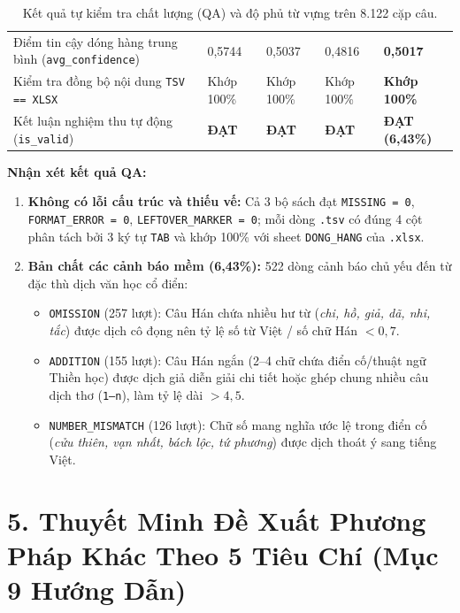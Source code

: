 \documentclass[11pt,a4paper]{article}
\begin{document}
\begin{table}[h!]
\begin{tabular}{L{5.6cm} C{2.1cm} C{2.1cm} C{2.1cm} C{2.5cm}}
Điểm tin cậy dóng hàng trung bình (\texttt{avg\_confidence}) & 0,5744 & 0,5037 & 0,4816 & \textbf{0,5017} \\
Kiểm tra đồng bộ nội dung \texttt{TSV == XLSX} & Khớp 100\% & Khớp 100\% & Khớp 100\% & \textbf{Khớp 100\%} \\
Kết luận nghiệm thu tự động (\texttt{is\_valid}) & \textbf{ĐẠT} & \textbf{ĐẠT} & \textbf{ĐẠT} & \textbf{ĐẠT (6,43\%)} \\
\bottomrule
\end{tabular}
\caption{Kết quả tự kiểm tra chất lượng (QA) và độ phủ từ vựng trên 8.122 cặp câu.}
\end{table}

\noindent\textbf{Nhận xét kết quả QA:}
\begin{enumerate}
    \item \textbf{Không có lỗi cấu trúc và thiếu vế:} Cả 3 bộ sách đạt \texttt{MISSING = 0}, \texttt{FORMAT\_ERROR = 0}, \texttt{LEFTOVER\_MARKER = 0}; mỗi dòng \texttt{.tsv} có đúng 4 cột phân tách bởi 3 ký tự \texttt{TAB} và khớp 100\% với sheet \texttt{DONG\_HANG} của \texttt{.xlsx}.
    \item \textbf{Bản chất các cảnh báo mềm (6,43\%):} 522 dòng cảnh báo chủ yếu đến từ đặc thù dịch văn học cổ điển:
    \begin{itemize}
        \item \texttt{OMISSION} (257 lượt): Câu Hán chứa nhiều hư từ (\textit{chi, hồ, giả, dã, nhi, tắc}) được dịch cô đọng nên tỷ lệ số từ Việt / số chữ Hán $< 0,7$.
        \item \texttt{ADDITION} (155 lượt): Câu Hán ngắn (2--4 chữ chứa điển cố/thuật ngữ Thiền học) được dịch giả diễn giải chi tiết hoặc ghép chung nhiều câu dịch thơ (\texttt{1--n}), làm tỷ lệ dài $> 4,5$.
        \item \texttt{NUMBER\_MISMATCH} (126 lượt): Chữ số mang nghĩa ước lệ trong điển cố (\textit{cửu thiên, vạn nhất, bách lộc, tứ phương}) được dịch thoát ý sang tiếng Việt.
    \end{itemize}
\end{enumerate}


\section{5. Thuyết Minh Đề Xuất Phương Pháp Khác Theo 5 Tiêu Chí (Mục 9 Hướng Dẫn)}
\end{document}
